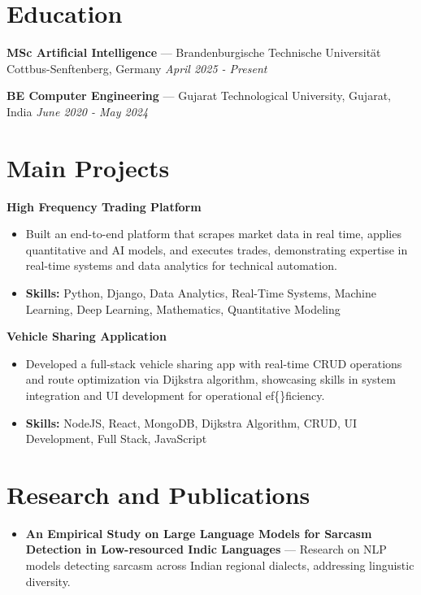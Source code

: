 \documentclass[a4paper,10pt]{article}
\begin{document}
\section*{Education}
\textbf{MSc Artificial Intelligence} — Brandenburgische Technische Universität Cottbus-Senftenberg, Germany \hfill \textit{April 2025 - Present}\par
\vspace{1.5pt}
\textbf{BE Computer Engineering} — Gujarat Technological University, Gujarat, India \hfill \textit{June 2020 - May 2024}\par

\section*{Main Projects}
\textbf{High Frequency Trading Platform}\par
\vspace{1pt}
\begin{itemize}
  \item Built an end-to-end platform that scrapes market data in real time, applies quantitative and AI models, and executes trades, demonstrating expertise in real-time systems and data analytics for technical automation.
  \item \textbf{Skills:} Python, Django, Data Analytics, Real-Time Systems, Machine Learning, Deep Learning, Mathematics, Quantitative Modeling
\end{itemize}
\vspace{3pt}
\textbf{Vehicle Sharing Application}\par
\vspace{1pt}
\begin{itemize}
  \item Developed a full-stack vehicle sharing app with real-time CRUD operations and route optimization via Dijkstra algorithm, showcasing skills in system integration and UI development for operational ef\{\}ficiency.
  \item \textbf{Skills:} NodeJS, React, MongoDB, Dijkstra Algorithm, CRUD, UI Development, Full Stack, JavaScript
\end{itemize}

\section*{Research and Publications}
\begin{itemize}
\item \textbf{An Empirical Study on Large Language Models for Sarcasm Detection in Low-resourced Indic Languages} — Research on NLP models detecting sarcasm across Indian regional dialects, addressing linguistic diversity.
\end{itemize}
\end{document}
